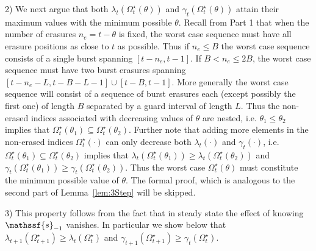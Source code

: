 \documentclass[journal, twocolumn, 10pt]{IEEEtran}
\newcommand{\rvs}{{\mathssf{s}}}    %
\begin{document}
{%
2) We next argue that both $\lambda_{t}(\Omega^\star_t(\theta))$ and $\gamma_t(\Omega_t^\star(\theta))$ attain their maximum values with the minimum possible $\theta$.
Recall from Part 1 that when the number of erasures $n_e=t-\theta$ is fixed, the worst case sequence must have all erasure positions as close to $t$ as possible. Thus if $n_e \le B$ the worst case sequence consists of a single burst spanning $[t-n_e, t-1]$. If $B < n_e \le 2B$, the worst case sequence must have two burst erasures spanning $ [t-n_e-L, t-B-L-1] \cup [t-B, t-1]$. More generally the worst case sequence will consist of a sequence of burst erasures each (except possibly the first one) of length $B$ separated by a guard interval of length $L$. Thus the non-erased indices associated with decreasing values of $\theta$ are nested, i.e. $\theta_1 \le \theta_2$ implies that $\Omega_t^\star(\theta_1) \subseteq \Omega_t^\star(\theta_2)$. 
Further note that adding more elements in the non-erased indices $\Omega_t^\star(\cdot)$ can only decrease both $\lambda_t(\cdot)$ and $\gamma_t(\cdot)$, i.e. $\Omega_t^\star(\theta_1) \subseteq \Omega_t^\star(\theta_2)$ implies that $\lambda_{t}(\Omega^\star_t(\theta_1)) \ge \lambda_{t}(\Omega^\star_t(\theta_2))$ and $\gamma_{t}(\Omega^\star_t(\theta_1)) \ge \gamma_{t}(\Omega^\star_t(\theta_2))$.
Thus the worst case $\Omega_t^\star(\theta)$ must constitute the minimum possible value of $\theta$. The formal proof, which is analogous to the second part of Lemma~\ref{lem:3Step} will be skipped.

3) This property follows from the fact that in steady state the effect of knowing $\rvs_{-1}$ vanishes.  In particular we show below that $\lambda_{t+1}(\Omega^{\star}_{t+1}) \ge \lambda_{t}(\Omega^{\star}_{t}) $ and
$\gamma_{t+1}(\Omega^{\star}_{t+1}) \ge \gamma_t(\Omega^\star_t)$.

}
\end{document}
